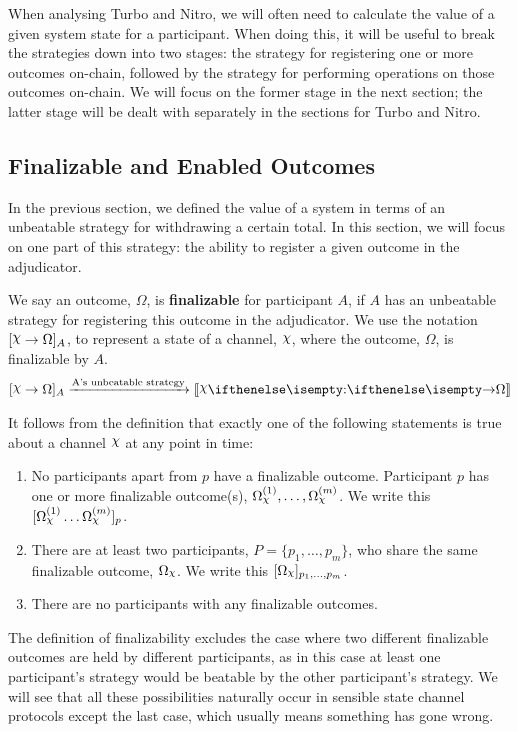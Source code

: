 \documentclass{article}
\begin{document}
When analysing Turbo and Nitro, we will often need to calculate the value of a given system
state for a participant.
When doing this, it will be useful to break the strategies down into two stages: the strategy
for registering one or more outcomes on-chain, followed by the strategy for performing operations
on those outcomes on-chain.
We will focus on the former stage in the next section; the latter stage will be dealt with
separately in the sections for Turbo and Nitro.

\subsection{Finalizable and Enabled Outcomes}

In the previous section, we defined the value of a system in terms of an unbeatable strategy
for withdrawing a certain total.
In this section, we will focus on one part of this strategy: the ability to register a given
outcome in the adjudicator.

We say an outcome, $\Omega$, is \textbf{finalizable} for participant $A$, if $A$ has an unbeatable
strategy for registering this outcome in the adjudicator.
We use the notation $\finalizable{\rchi}{\Omega}{A}$, to represent a state of a channel, $\rchi$,
where the outcome, $\Omega$, is finalizable by $A$.
\begin{align*}
  \finalizable{\rchi}{\Omega}{A} \xrightarrow{\text{A's unbeatable strategy}} \adj{\holds{\rchi}{}{}{\Omega}}
\end{align*}

It follows from the definition that exactly one of the following statements is true about
a channel $\rchi$ at any point in time:
\begin{enumerate}
  \item No participants apart from $p$ have a finalizable outcome.
        Participant $p$ has one or more finalizable outcome(s), $\Omega_\rchi^{(1)}, \dots, \Omega_\rchi^{(m)}$.
        We write this $\enf{\Omega_\rchi^{(1)} \dots \Omega_\rchi^{(m)}}_p$.
  \item There are at least two participants, $P = \{p_1, \dots, p_m \}$, who share the same
        finalizable outcome, $\Omega_\rchi$. We write this $\enf{\Omega_\rchi}_{p_1, \dots, p_m}$.
  \item There are no participants with any finalizable outcomes.
\end{enumerate}
The definition of finalizability excludes the case where two different finalizable outcomes are held
by different participants, as in this case at least one participant's strategy would be beatable
by the other participant's strategy.
We will see that all these possibilities naturally occur in sensible state channel protocols
except the last case, which usually means something has gone wrong.
\end{document}
